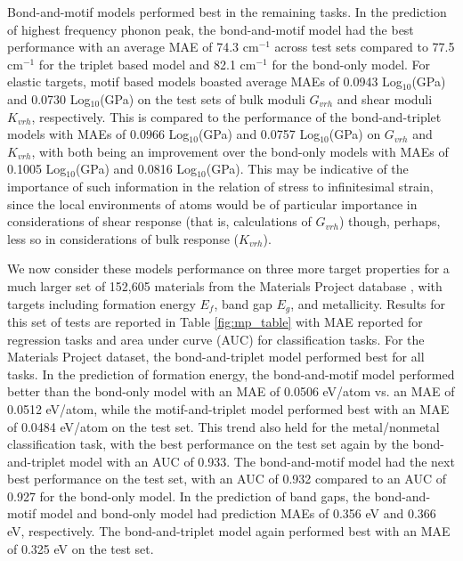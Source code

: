 \documentclass[twoside,twocolumn,9pt]{article}
\begin{document}
Bond-and-motif models performed best in the remaining tasks. In the prediction of highest frequency phonon peak, the bond-and-motif model had the best performance with an average MAE of 74.3 cm$^{-1}$ across test sets compared to 77.5 cm$^{-1}$ for the triplet based model and 82.1 cm$^{-1}$ for the bond-only model. For elastic targets, motif based models boasted average MAEs of 0.0943 Log$_{10}$(GPa) and 0.0730 Log$_{10}$(GPa) on the test sets of bulk moduli $G_{vrh}$ and shear moduli $K_{vrh}$, respectively. This is compared to the performance of the bond-and-triplet models with MAEs of 0.0966 Log$_{10}$(GPa) and 0.0757 Log$_{10}$(GPa) on $G_{vrh}$ and $K_{vrh}$, with both being an improvement over the bond-only models with MAEs of 0.1005 Log$_{10}$(GPa) and 0.0816 Log$_{10}$(GPa). This may be indicative of the importance of such information in the relation of stress to infinitesimal strain, since the local environments of atoms would be of particular importance in considerations of shear response (that is, calculations of $G_{vrh}$) though, perhaps, less so in considerations of bulk response ($K_{vrh}$). %


We now consider these models performance on three more target properties for a much larger set of 152,605
materials from the Materials Project database \cite{matproj}, with targets including formation energy $E_f$, band gap $E_g$, and metallicity.  Results for this set of tests are reported in Table \ref{fig:mp_table} with MAE reported for regression tasks and area under curve (AUC) for classification tasks. 
For the Materials Project dataset, the bond-and-triplet model performed best for all tasks. In the prediction of formation energy, the bond-and-motif model performed better than the bond-only model with an MAE of 0.0506 eV/atom vs. an MAE of 0.0512 eV/atom, while the motif-and-triplet model performed best with an MAE of 0.0484 eV/atom on the test set. This trend also held for the metal/nonmetal classification task, with the best performance on the test set again by the bond-and-triplet model with an AUC of 0.933. The bond-and-motif model had the next best performance on the test set, with an AUC of 0.932 compared to an AUC of 0.927 for the bond-only model. In the prediction of band gaps, the bond-and-motif model and bond-only model had prediction MAEs of 0.356 eV and 0.366 eV, respectively. The bond-and-triplet model again performed best with an MAE of 0.325 eV on the test set. 
\end{document}
